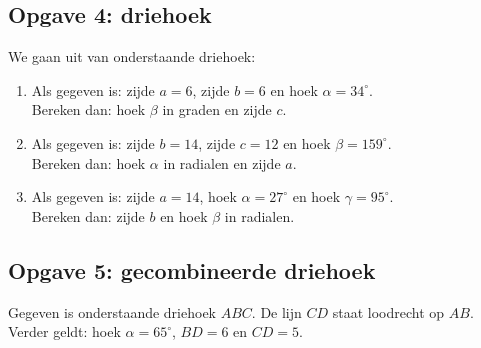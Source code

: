 \newpage
\subsection*{Opgave 4: driehoek}

We gaan uit van onderstaande driehoek:

\begin{center}
\end{center}


\renewcommand{\arraystretch}{1.5}
\begin{enumerate}
    \item[a. ] Als gegeven is: zijde $a = 6$, zijde $b = 6$ en hoek $\alpha = 34^\circ$. \\
               Bereken dan: hoek $\beta$ in graden en zijde $c$. \\
               
    \item[b. ]  Als gegeven is: zijde $b = 14$, zijde $c = 12$ en hoek $\beta = 159^\circ$. \\
                Bereken dan: hoek $\alpha$ in radialen en zijde $a$. \\
                
    \item[c. ]  Als gegeven is: zijde $a = 14$, hoek $\alpha = 27^\circ$ en hoek $\gamma = 95^\circ$. \\
                Bereken dan: zijde $b$ en hoek $\beta$ in radialen. \\
\end{enumerate}

\subsection*{Opgave 5: gecombineerde driehoek}
Gegeven is onderstaande driehoek $ABC$. De lijn $CD$ staat loodrecht op $AB$. Verder geldt: hoek $\alpha = 65^\circ$, $BD = 6$ en $CD = 5$. \\

